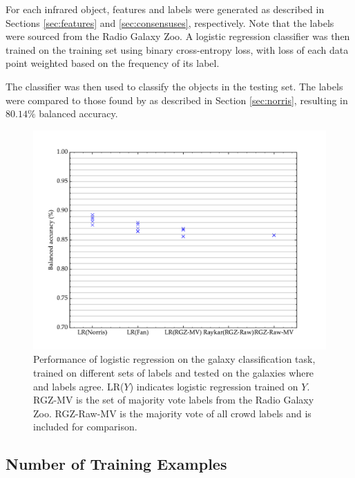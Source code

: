     For each infrared object, features and labels were generated as described in Sections \ref{sec:features} and \ref{sec:consensuses}, respectively. Note that the labels were sourced from the Radio Galaxy Zoo. A logistic regression classifier was then trained on the training set using binary cross-entropy loss, with loss of each data point weighted based on the frequency of its label.

    The classifier was then used to classify the objects in the testing set. The labels were compared to those found by \citet{norris06} as described in Section \ref{sec:norris}, resulting in $80.14\%$ balanced accuracy.


    \begin{figure}[!ht]
      \centering
      \includegraphics[width=\textwidth]{images/experiments/predictors.pdf}
      \caption{Performance of logistic regression on the galaxy classification task, trained on different sets of labels and tested on the galaxies where \citeauthor{norris06} and \citeauthor{fan15} labels agree. LR($Y$) indicates logistic regression trained on $Y$. RGZ-MV is the set of majority vote labels from the Radio Galaxy Zoo. RGZ-Raw-MV is the majority vote of all crowd labels and is included for comparison.}
    \end{figure}

  \subsection{Number of Training Examples}

